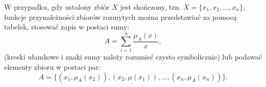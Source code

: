 \documentclass[a4paper,12pt]{article}
\theoremstyle{definition}
\begin{document}
W przypadku, gdy ustalony zbiór $X$ jest skończony, tzn. $X = \{ x_1,x_2, \dots , x_n \}$, funkcje przynależności zbiorów rozmytych można przedstawiać za pomocą tabelek, stosować zapis w postaci sumy:
\begin{equation}
	A = \sum_{i=1}^{n} \frac{\mu_A(x)}{x},
\end{equation}
(kreski ułamkowe i znaki sumy należy rozumieć czysto symbolicznie) lub podawać elementy zbioru w postaci par:
\begin{equation}
	A =\{(x_1,\mu_A(x_2)),(x_2,\mu(x_1)),\dots,(x_n,\mu_A(x_n))\}.
\end{equation}
\end{document}
